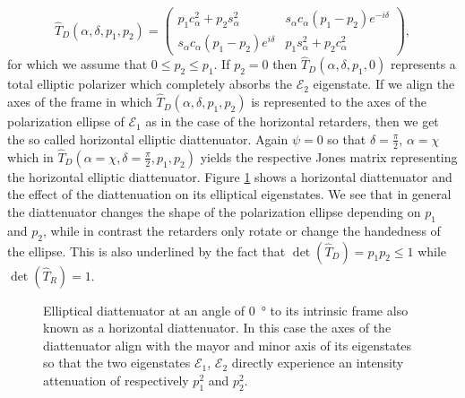 \begin{equation}
    \hat{T}_D(\alpha, \delta, p_1, p_2) = 
    \begin{pmatrix} 
    p_1 c_{\alpha}^2 + p_2 s_{\alpha}^2 & s_{\alpha}c_{\alpha}(p_1-p_2)e^{-i\delta} \\
    s_{\alpha}c_{\alpha}(p_1-p_2)e^{i\delta} & p_1 s_{\alpha}^2 + p_2 c_{\alpha}^2
    \end{pmatrix},
\end{equation}
for which we assume that $0\leq p_2\leq p_1$. If $p_2=0$ then $\hat{T}_D(\alpha, \delta, p_1, 0)$ represents a total elliptic polarizer which completely absorbs the $\bm{\mathcal{E}}_2$ eigenstate. If we align the axes of the frame in which $\hat{T}_D(\alpha, \delta, p_1, p_2)$ is represented to the axes of the polarization ellipse of $\bm{\mathcal{E}}_1$ as in the case of the horizontal retarders, then we get the so called horizontal elliptic diattenuator. Again $\psi=0$ so that $\delta=\frac{\pi}{2}$, $\alpha=\chi$ which in $\hat{T}_D(\alpha=\chi, \delta=\frac{\pi}{2}, p_1, p_2)$ yields the respective Jones matrix representing the horizontal elliptic diattenuator. Figure \ref{fig:horizontal_diattenuator} shows a horizontal diattenuator and the effect of the diattenuation on its elliptical eigenstates. We see that in general the diattenuator changes the shape of the polarization ellipse depending on $p_1$ and $p_2$, while in contrast the retarders only rotate or change the handedness of the ellipse. This is also underlined by the fact that $\det(\hat{T}_D) = p_1p_2 \leq 1$ while $\det(\hat{T}_{R}) = 1$.

\begin{figure}[h]
    \centering
    
    \caption{Elliptical diattenuator at an angle of \SI{0}{\degree} to its intrinsic frame also known as a horizontal diattenuator. In this case the axes of the diattenuator align with the mayor and minor axis of its eigenstates so that the two eigenstates $\bm{\mathcal{E}}_1$, $\bm{\mathcal{E}}_2$ directly experience an intensity attenuation of respectively $p_1^2$ and $p_2^2$.}
    \label{fig:horizontal_diattenuator}
\end{figure}

